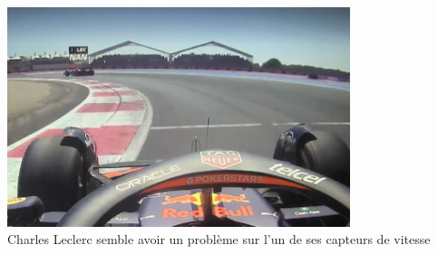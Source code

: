 \documentclass{magnoliaold}
\begin{document}
  \begin{center}
    \includegraphics[width = 10cm]{../../commun/images/python-cours-nan}\\
    Charles Leclerc semble avoir un problème sur l'un de ses capteurs de vitesse
  \end{center}
\end{document}
